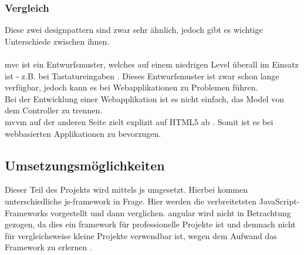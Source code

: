 \subsubsection{Vergleich}
Diese zwei \Gls{designpattern} sind zwar sehr ähnlich, jedoch gibt es wichtige Unterschiede zwischen ihnen.\\\\
\Gls{mvc} ist ein Entwurfsmuster, welches auf einem niedrigen Level überall im Einsatz ist - z.B. bei Tastatureingaben \cite{mvc}. Dieses Entwurfsmuster ist zwar schon lange verfügbar, jedoch kann es bei Webapplikationen zu Problemen führen.\\
Bei der Entwicklung einer Webapplikation ist es nicht einfach, das Model von dem Controller zu trennen.\\
\Gls{mvvm} auf der anderen Seite zielt explizit auf HTML5 ab \cite{mvvm_vue}. Somit ist es bei webbasierten Applikationen zu bevorzugen.
\newpage
\subsection{Umsetzungsmöglichkeiten}
Dieser Teil des Projekts wird mittels \Gls{js} umgesetzt. Hierbei kommen unterschiedliche \Gls{js}-\Gls{framework} in Frage. Hier werden die verbreitetsten JavaScript-Frameworks vorgestellt und dann verglichen. \Gls{angular} wird nicht in Betrachtung gezogen, da dies ein \Gls{framework} für professionelle Projekte ist und demnach nicht für vergleichsweise kleine Projekte verwendbar ist, wegen dem Aufwand das Framework zu erlernen \cite{angular_ex}.
